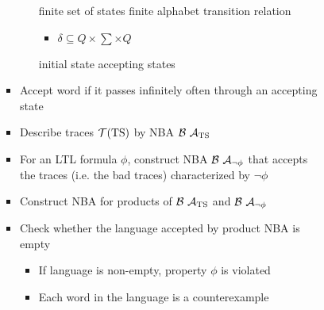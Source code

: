 \begin{itemize}
\begin{itemize}
\begin{itemize}
\begin{itemize}
\begin{itemize}
\begin{itemize}
                                             finite set of states
                                            \ides{$\sum$:} finite alphabet
                                            \ides{$\delta$:} transition relation
                                                \begin{itemize}
                                                    \item $\delta \subseteq Q \times \sum \times Q$
                                                \end{itemize}
                                             initial state
                                             accepting states
                                        \end{itemize}
                                    \item Accept word if it passes infinitely often through an accepting state
                                \end{itemize}
                                \begin{itemize}
                                    \item Describe traces $\mathcal{T}(\text{TS})$ by NBA $\mc{B} \ \mc{A}_{\text{TS}}$
                                    \item For an LTL formula $\phi$, construct NBA $\mc{B} \ \mc{A}_{\neg \phi}$ that accepts the traces (i.e. the bad traces) characterized by $\neg \phi$
                                    \item Construct NBA for products of $\mc{B} \ \mc{A}_{\text{TS}}$ and $\mc{B} \ \mc{A}_{\neg \phi}$
                                    \item Check whether the language accepted by product NBA is empty
                                        \begin{itemize}
                                            \item If language is non-empty, property $\phi$ is violated
                                            \item Each word in the language is a counterexample
                                        \end{itemize}
                                \end{itemize}
                        \end{itemize}
                        \begin{itemize}

\end{itemize}
\end{itemize}
\end{itemize}
\end{itemize}
